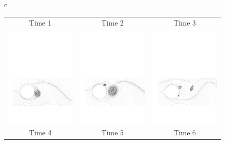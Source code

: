 \begin{figure}[ht]
\begin{center}
\begin{tabular}{c}
{\begin{tabular}{ccc}
        \\
         Time 1 & Time 2 & Time 3
        \\
         \includegraphics[width=45mm,clip=t]{CHAP_NONLIN/FIGURE/cil5.pdf}
         &
         \includegraphics[width=45mm,clip=t]{CHAP_NONLIN/FIGURE/cil6.pdf}
         &
         \includegraphics[width=45mm,clip=t]{CHAP_NONLIN/FIGURE/cil1.pdf}
        \\
         Time 4 & Time 5 & Time 6
       \end{tabular}}
     \\
\end{tabular}
\end{center}
\end{figure}
